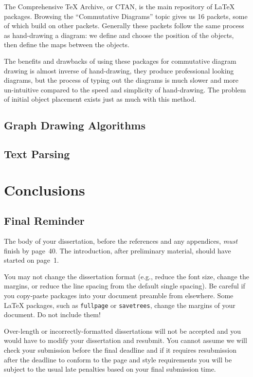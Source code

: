 \documentclass[logo,bsc,singlespacing,parskip]{infthesis}
\theoremstyle{definition}
\begin{document}
The Comprehensive \TeX{} Archive, or CTAN, is the main repository of \LaTeX{} packages. Browsing the ``Commutative Diagrams'' topic \cite{ctancommdiag} gives us 16 packets, some of which build on other packets. Generally these packets follow the same process as hand-drawing a diagram: we define and choose the position of the objects, then define the maps between the objects.

The benefits and drawbacks of using these packages for commutative diagram drawing is almost inverse of hand-drawing, they produce professional looking diagrams, but the process of typing out the diagrams is much slower and more un-intuitive compared to the speed and simplicity of hand-drawing. The problem of initial object placement exists just as much with this method.

\section{Graph Drawing Algorithms}\label{bkg:graph-draw}

\section{Text Parsing}\label{bkg:text-parse}


\chapter{Conclusions}

\section{Final Reminder}

The body of your dissertation, before the references and any appendices,
\emph{must} finish by page~40. The introduction, after preliminary material,
should have started on page~1.

You may not change the dissertation format (e.g., reduce the font size, change
the margins, or reduce the line spacing from the default single spacing). Be
careful if you copy-paste packages into your document preamble from elsewhere.
Some \LaTeX{} packages, such as \texttt{fullpage} or \texttt{savetrees}, change
the margins of your document. Do not include them!

Over-length or incorrectly-formatted dissertations will not be accepted and you
would have to modify your dissertation and resubmit. You cannot assume we will
check your submission before the final deadline and if it requires resubmission
after the deadline to conform to the page and style requirements you will be
subject to the usual late penalties based on your final submission time.
\end{document}
